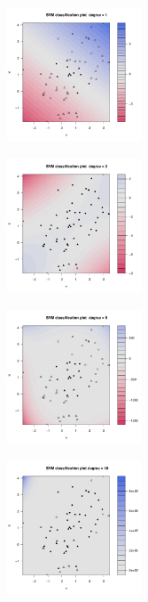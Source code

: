 \begin{figure}[H]
	\centering
	\begin{subfigure}{4cm}
		\includegraphics[width=4cm]{Graphics/Problema_01/Experiment_02_1.pdf}
		\caption{}
	\end{subfigure}
	\begin{subfigure}{4cm}
		\includegraphics[width=4cm]{Graphics/Problema_01/Experiment_02_2.pdf}
		\caption{}
	\end{subfigure}
	\begin{subfigure}{4cm}
		\includegraphics[width=4cm]{Graphics/Problema_01/Experiment_02_3.pdf}
		\caption{}
	\end{subfigure}
	\begin{subfigure}{4cm}
		\includegraphics[width=4cm]{Graphics/Problema_01/Experiment_02_4.pdf}
		\caption{}
	\end{subfigure}
	\caption{}
\end{figure}


